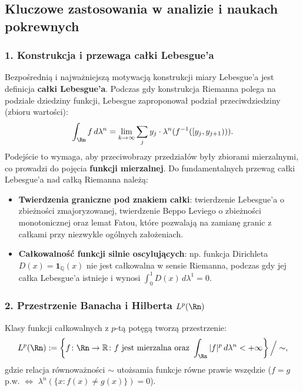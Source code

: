 \subsection{Kluczowe zastosowania w analizie i naukach pokrewnych}

\subsubsection{1. Konstrukcja i przewaga całki Lebesgue'a}

Bezpośrednią i najważniejszą motywacją konstrukcji miary Lebesgue'a jest definicja \textbf{całki Lebesgue'a}. Podczas gdy konstrukcja Riemanna polega na podziale dziedziny funkcji, Lebesgue zaproponował podział przeciwdziedziny (zbioru wartości):
\begin{equation}
    \int_{\Rn} f \, d\lambda^n = \lim_{k \to \infty} \sum_{j} y_j \cdot \lambda^n(f^{-1}([y_j, y_{j+1}))).
\end{equation}
Podejście to wymaga, aby przeciwobrazy przedziałów były zbiorami mierzalnymi, co prowadzi do pojęcia \textbf{funkcji mierzalnej}. Do fundamentalnych przewag całki Lebesgue'a nad całką Riemanna należą:
\begin{itemize}
    \item \textbf{Twierdzenia graniczne pod znakiem całki}: twierdzenie Lebesgue'a o zbieżności zmajoryzowanej, twierdzenie Beppo Leviego o zbieżności monotonicznej oraz lemat Fatou, które pozwalają na zamianę granic z całkami przy niezwykle ogólnych założeniach.
    \item \textbf{Całkowalność funkcji silnie oscylujących}: np. funkcja Dirichleta $D(x) = \mathbf{1}_{\mathbb{Q}}(x)$ nie jest całkowalna w sensie Riemanna, podczas gdy jej całka Lebesgue'a istnieje i wynosi $\int_0^1 D(x)\,d\lambda^1 = 0$.
\end{itemize}

\subsubsection{2. Przestrzenie Banacha i Hilberta $L^p(\Rn)$}

Klasy funkcji całkowalnych z $p$-tą potęgą tworzą przestrzenie:
\begin{equation}
    L^p(\Rn) := \left\{ f \colon \Rn \to \mathbb{R} \colon f \text{ jest mierzalna oraz } \int_{\Rn} |f|^p \, d\lambda^n < +\infty \right\} \Big/ \sim,
\end{equation}
gdzie relacja równoważności $\sim$ utożsamia funkcje równe prawie wszędzie ($f = g$ p.w. $\iff$ $\lambda^n(\{x \colon f(x) \neq g(x)\}) = 0$).

